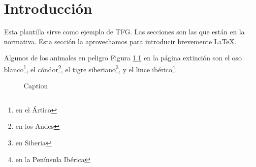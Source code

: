 \chapter{Introducción}
Esta plantilla sirve como ejemplo de TFG. Las secciones son las que están en la normativa. Esta sección la aprovechamos para introducir brevemente \LaTeX.

Algunos de los animales en peligro Figura \ref{fig:my_label} en la página \pageref{fig:my_label} extinción son el oso blanco\footnote{en el Ártico}, el cóndor\footnote{en los Andes}, el tigre siberiano\footnote{en Siberia}, y el lince ibérico\footnote{en la Península Ibérica}.

\begin{figure}
    \centering
    
    \caption{Caption}
    \label{fig:my_label}
\end{figure}